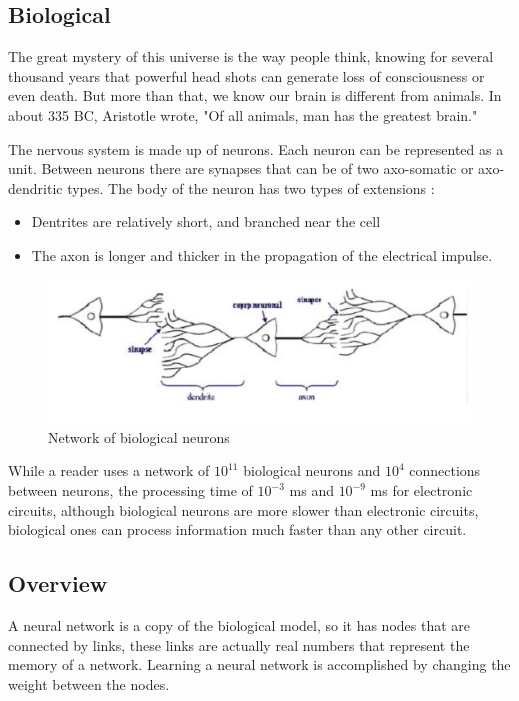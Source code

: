 \subsection{Biological}

The great mystery of this universe is the way people think, knowing for several 
thousand years that powerful head shots can generate loss of consciousness or even death.
But more than that, we know our brain is different from animals. 
In about 335 BC, Aristotle wrote, "Of all animals, man has the greatest brain." \cite{book.neuronal.network.1995}

The nervous system is made up of neurons. Each neuron can be represented as a unit.
Between neurons there are synapses that can be of two axo-somatic or axo-dendritic types. 
The body of the neuron has two types of extensions \cite{book.anatomie.1985}:
\begin{itemize}
\item Dentrites are relatively short, and branched near the cell
\item The axon is longer and thicker in the propagation of the electrical impulse.
\end{itemize}

\begin{figure}[htbp]
	\centerline{\includegraphics[scale=0.75]{fig/neuron.png}}  
	\caption{Network of biological neurons}
\end{figure}

While a reader uses a network of  $10^{11}$ biological neurons and $10^{4}$ connections between neurons, 
the processing time of $10^{-3}$ ms and $10^{-9}$ ms for electronic circuits, 
although biological neurons are more slower than electronic circuits, biological ones can process information much faster than any other circuit. \cite{book.anatomie.1985}
\subsection{Overview}

A neural network is a copy of the biological model, so it has nodes that are connected by links,
these links are actually real numbers that represent the memory of a network. 
Learning a neural network is accomplished by changing the weight between the nodes.


